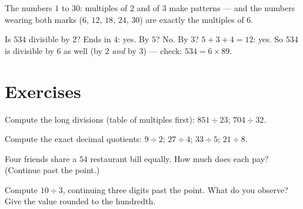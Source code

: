\begin{omfigure}

{\small The numbers $1$ to $30$: multiples of $2$ and of $3$ make
patterns --- and the numbers wearing both marks ($6$, $12$, $18$,
$24$, $30$) are exactly the multiples of $6$.}
\end{omfigure}

\begin{example}\label{ex:g5:division:criteria}
Is $534$ divisible by $2$? Ends in $4$: yes. By $5$? No. By $3$?
$5 + 3 + 4 = 12$: yes. So $534$ is divisible by $6$ as well (by $2$
\emph{and} by $3$) --- check: $534 = 6 \times 89$.
\end{example}

\section{Exercises}

\begin{exercise}[$\star$]\label{exo:g5:division:1}
Compute the long divisions (table of multiples first):
$851 \div 23$; \quad $704 \div 32$.
\end{exercise}

\begin{exercise}[$\star$]\label{exo:g5:division:2}
Compute the exact decimal quotients: $9 \div 2$; \quad $27 \div 4$;
\quad $33 \div 5$; \quad $21 \div 8$.
\end{exercise}

\begin{exercise}[$\star$]\label{exo:g5:division:3}
Four friends share a $54$ restaurant bill equally. How much does
each pay? (Continue past the point.)
\end{exercise}

\begin{exercise}[$\star$]\label{exo:g5:division:4}
Compute $10 \div 3$, continuing three digits past the point. What do
you observe? Give the value rounded to the hundredth.
\end{exercise}

